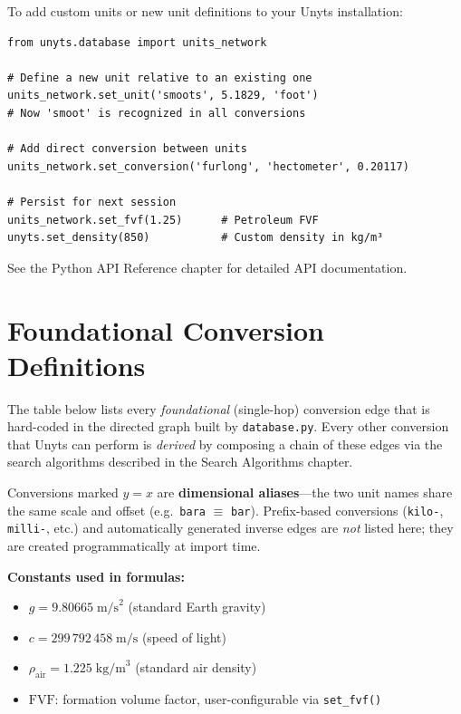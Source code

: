 \documentclass[11pt,a4paper]{report}
\begin{document}
To add custom units or new unit definitions to your Unyts installation:

\begin{lstlisting}[style=pythonstyle]
from unyts.database import units_network

# Define a new unit relative to an existing one
units_network.set_unit('smoots', 5.1829, 'foot')
# Now 'smoot' is recognized in all conversions

# Add direct conversion between units
units_network.set_conversion('furlong', 'hectometer', 0.20117)

# Persist for next session
units_network.set_fvf(1.25)      # Petroleum FVF
unyts.set_density(850)           # Custom density in kg/m³
\end{lstlisting}

See the Python API Reference chapter for detailed API documentation.

\chapter{Foundational Conversion Definitions}
\label{app:conversions}

The table below lists every \emph{foundational} (single-hop) conversion edge
that is hard-coded in the directed graph built by \texttt{database.py}.
Every other conversion that Unyts can perform is \emph{derived} by composing
a chain of these edges via the search algorithms described in
the Search Algorithms chapter.

Conversions marked $y = x$ are \textbf{dimensional aliases}---the two unit
names share the same scale and offset (e.g.\ \texttt{bara} $\equiv$
\texttt{bar}).  Prefix-based conversions (\texttt{kilo-}, \texttt{milli-},
etc.) and automatically generated inverse edges are \emph{not} listed here;
they are created programmatically at import time.

\medskip
{\small\textbf{Constants used in formulas:}}
\begin{itemize}[nosep]
  \item $g = 9.80665\;\text{m/s}^{2}$ \quad(standard Earth gravity)
  \item $c = 299\,792\,458\;\text{m/s}$ \quad(speed of light)
  \item $\rho_{\text{air}} = 1.225\;\text{kg/m}^{3}$ \quad(standard air density)
  \item $\text{FVF}$: formation volume factor, user-configurable via \texttt{set\_fvf()}
\end{itemize}
\end{document}
